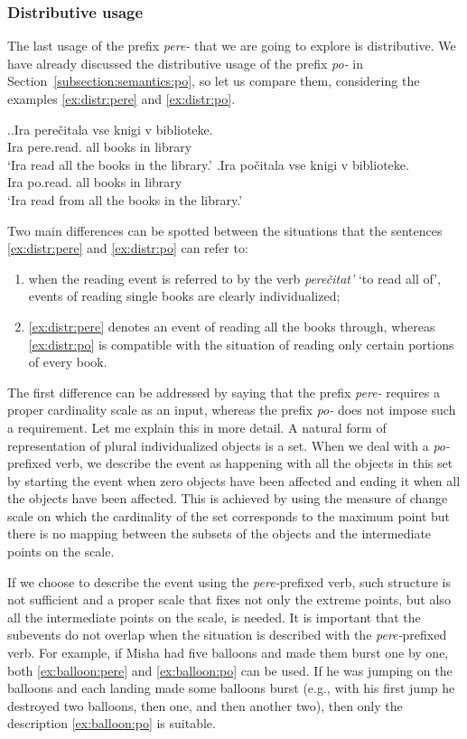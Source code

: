 \subsubsection{Distributive usage}
The last usage of the prefix \textit{pere-} that we are going to explore is distributive. We have already discussed the distributive usage of the prefix \textit{po-} in Section~\ref{subsection:semantics:po}, so let us compare them, considering the examples \ref{ex:distr:pere} and \ref{ex:distr:po}.

\ex.\ag.\label{ex:distr:pere}Ira pere\v{c}itala vse knigi v biblioteke.\\
Ira pere.read. all books in library\\
\trans `Ira read all the books in the library.'
\bg.\label{ex:distr:po}Ira po\v{c}itala vse knigi v biblioteke.\\
Ira po.read. all books in library\\
\trans `Ira read from all the books in the library.'

Two main differences can be spotted between the situations that the sentences \ref{ex:distr:pere} and \ref{ex:distr:po} can refer to:
\begin{enumerate}
\item when the reading event is referred to by the verb \textit{pere\v{c}itat'} `to read all of', events of reading single books are clearly individualized;
\item \ref{ex:distr:pere} denotes an event of reading all the books through, whereas \ref{ex:distr:po} is compatible with the situation of reading only certain portions of every book.
\end{enumerate}

The first difference can be addressed by saying that the prefix \textit{pere-} requires a proper cardinality scale as an input, whereas the prefix \textit{po-} does not impose such a requirement. Let me explain this in more detail. A natural form of representation of plural individualized objects is a set. When we deal with a \textit{po-}prefixed verb, we describe the event as happening with all the objects in this set by starting the event when zero objects have been affected and ending it when all the objects have been affected. This is achieved by using the measure of change scale on which the cardinality of the set corresponds to the maximum point but there is no mapping between the subsets of the objects and the intermediate points on the scale.

If we choose to describe the event using the \textit{pere-}prefixed verb, such structure is not sufficient and a proper scale that fixes not only the extreme points, but also all the intermediate points on the scale, is needed. It is important that the subevents do not overlap when the situation is described with the \textit{pere-}prefixed verb. For example, if Misha had five balloons and made them burst one by one, both \ref{ex:balloon:pere} and \ref{ex:balloon:po} can be used. If he was jumping on the balloons and each landing made some balloons burst (e.g., with his first jump he destroyed two balloons, then one, and then another two), then only the description \ref{ex:balloon:po} is suitable.

